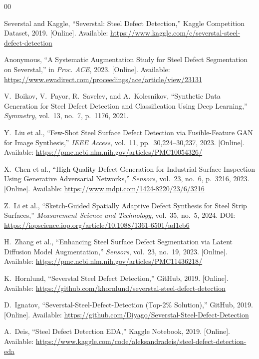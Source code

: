 \documentclass[conference]{IEEEtran}
\begin{document}
\begin{thebibliography}{00}

Severstal and Kaggle, ``Severstal: Steel Defect Detection,''
Kaggle Competition Dataset, 2019. [Online]. Available:
\url{https://www.kaggle.com/c/severstal-steel-defect-detection}

Anonymous, ``A Systematic Augmentation Study for Steel Defect
Segmentation on Severstal,'' in \textit{Proc. ACE}, 2023.
[Online]. Available:
\url{https://www.ewadirect.com/proceedings/ace/article/view/23131}

V.~Boikov, V.~Payor, R.~Savelev, and A.~Kolesnikov,
``Synthetic Data Generation for Steel Defect Detection and
Classification Using Deep Learning,'' \textit{Symmetry}, vol.~13,
no.~7, p.~1176, 2021.

Y.~Liu et al., ``Few-Shot Steel Surface Defect Detection via
Fusible-Feature GAN for Image Synthesis,'' \textit{IEEE Access},
vol.~11, pp.~30,224--30,237, 2023. [Online]. Available:
\url{https://pmc.ncbi.nlm.nih.gov/articles/PMC10054326/}

X.~Chen et al., ``High-Quality Defect Generation for Industrial
Surface Inspection Using Generative Adversarial Networks,''
\textit{Sensors}, vol.~23, no.~6, p.~3216, 2023. [Online]. Available:
\url{https://www.mdpi.com/1424-8220/23/6/3216}

Z.~Li et al., ``Sketch-Guided Spatially Adaptive Defect Synthesis
for Steel Strip Surfaces,'' \textit{Measurement Science and
Technology}, vol.~35, no.~5, 2024. DOI:
\url{https://iopscience.iop.org/article/10.1088/1361-6501/ad1eb6}

H.~Zhang et al., ``Enhancing Steel Surface Defect Segmentation via
Latent Diffusion Model Augmentation,'' \textit{Sensors}, vol.~23,
no.~19, 2023. [Online]. Available:
\url{https://pmc.ncbi.nlm.nih.gov/articles/PMC11436218/}

K.~Hornlund, ``Severstal Steel Defect Detection,'' GitHub, 2019.
[Online]. Available:
\url{https://github.com/khornlund/severstal-steel-defect-detection}

D.~Ignatov, ``Severstal-Steel-Defect-Detection (Top-2\%
Solution),'' GitHub, 2019. [Online]. Available:
\url{https://github.com/Diyago/Severstal-Steel-Defect-Detection}

A.~Deis, ``Steel Defect Detection EDA,'' Kaggle Notebook,
2019. [Online]. Available:
\url{https://www.kaggle.com/code/aleksandradeis/steel-defect-detection-eda}

\end{thebibliography}
\end{document}

